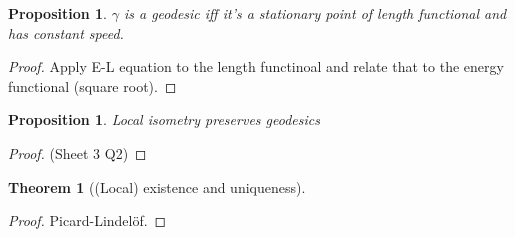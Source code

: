 \documentclass{article}
\theoremstyle{definition}
\theoremstyle{remark}
\theoremstyle{plain}
\newtheorem{thm}[defn]{Theorem}
\newtheorem{prop}[defn]{Proposition}
\theoremstyle{definition}
\begin{document}
\begin{prop}
    $\gamma$ is a geodesic iff it's a stationary point of length functional and has constant speed.
\end{prop}
\begin{proof}
    Apply E-L equation to the length functinoal and relate that to the energy functional (square root).
\end{proof}
\begin{prop}
    Local isometry preserves geodesics
\end{prop}
\begin{proof}
    (Sheet 3 Q2)
\end{proof}
\begin{thm}[(Local) existence and uniqueness]
    
\end{thm}
\begin{proof}
    Picard-Lindel\"of.
\end{proof}
\end{document}
